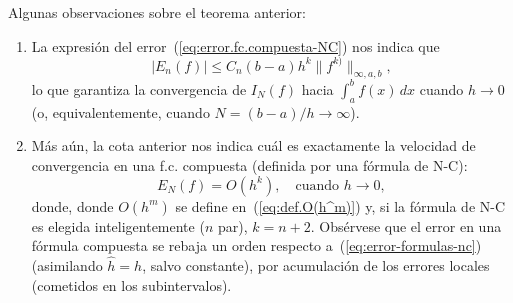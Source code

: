 Algunas observaciones sobre el teorema anterior:
\begin{enumerate}
\item La expresión del error~(\ref{eq:error.fc.compuesta-NC}) nos
  indica que
  \begin{equation*}
    |E_n(f)| \le C_n (b-a) h^k \|f^{k)}\|_{\infty,a,b},
  \end{equation*}
  lo que
  garantiza la convergencia de $I_N(f)$ hacia $\int_a^b f(x)\, dx$
  cuando $h\to 0$ (o, equivalentemente, cuando $N=(b-a)/h \to\infty$).
\item Más aún, la cota anterior nos indica cuál es exactamente la
  velocidad de convergencia en una f.c. compuesta (definida por una
  fórmula de N-C):
  \begin{equation*}
      E_N(f)=O(h^{k}), \quad \text{cuando } h\to 0,
  \end{equation*}
  donde, donde $O(h^m)$ se define en~(\ref{eq:def.O(h^m)}) y, si la
  fórmula de N-C es elegida inteligentemente ($n$ par), $k=n+2$.
  Obsérvese que el error en una fórmula compuesta se rebaja un orden
  respecto a~(\ref{eq:error-formulas-nc}) (asimilando $\widehat h =
  h$, salvo constante), por acumulación de los errores locales
  (cometidos en los subintervalos).
\end{enumerate}

